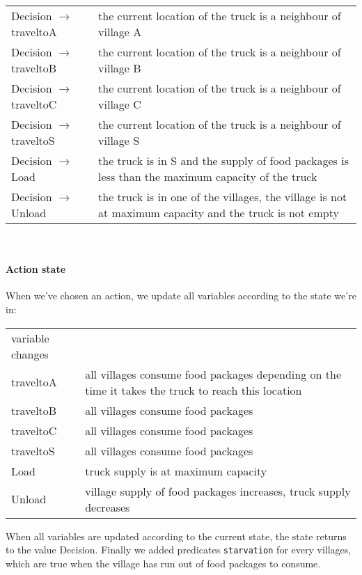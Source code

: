 \documentclass[12pt]{article}
\begin{document}
\begin{tabular}{|l|p{12cm}|}
\hline
Decision $\rightarrow$ traveltoA & the current location of the truck is a neighbour of village A\\
Decision $\rightarrow$ traveltoB & the current location of the truck is a neighbour of village B\\
Decision $\rightarrow$ traveltoC & the current location of the truck is a neighbour of village C\\
Decision $\rightarrow$ traveltoS & the current location of the truck is a neighbour of village S\\
Decision $\rightarrow$ Load & the truck is in S and the supply of food packages
	is less than the maximum capacity of the truck\\
Decision $\rightarrow$ Unload & the truck is in one of the villages, 
	the village is not at maximum capacity and 
	the truck is not empty\\
\hline
\end{tabular}\\

\paragraph{Action state} When we've chosen an action, we update all variables according to the state we're in:\\

\begin{tabular}{|l|p{12cm}|}
\hline
variable changes&\\
traveltoA & all villages consume food packages 
	depending on the time it takes the truck to reach this location\\
traveltoB & all villages consume food packages\\
traveltoC & all villages consume food packages\\
traveltoS & all villages consume food packages\\
Load & truck supply is at maximum capacity\\ 
Unload & village supply of food packages increases, 
	truck supply decreases\\
\hline
\end{tabular}

When all variables are updated according to the current state, 
the state returns to the value Decision.
Finally we added predicates \texttt{starvation} for every villages, which are true when the village has run out of food packages to consume.
\end{document}
